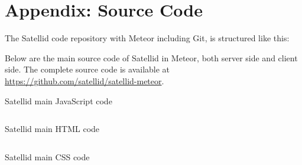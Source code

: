 \chapter{Appendix: Source Code}
\label{apx:source-code}

The Satellid code repository with Meteor including Git, is structured like this:


\noindent Below are the main source code of Satellid in Meteor, both server side and client side.
The complete source code is available at \url{https://github.com/satellid/satellid-meteor}.

\begin{listing}[ht]
  \caption{Satellid main JavaScript code}
  \inputminted{javascript}{\dir/code/app.js}
  \label{lst:satellid-code-js}
\end{listing}

\begin{listing}[ht]
  \caption{Satellid main HTML code}
  \inputminted{html}{\dir/code/app.html}
  \label{lst:satellid-code-html}
\end{listing}

\begin{listing}[ht]
  \caption{Satellid main CSS code}
  \inputminted{css}{\dir/code/app.css}
  \label{lst:satellid-code-css}
\end{listing}
